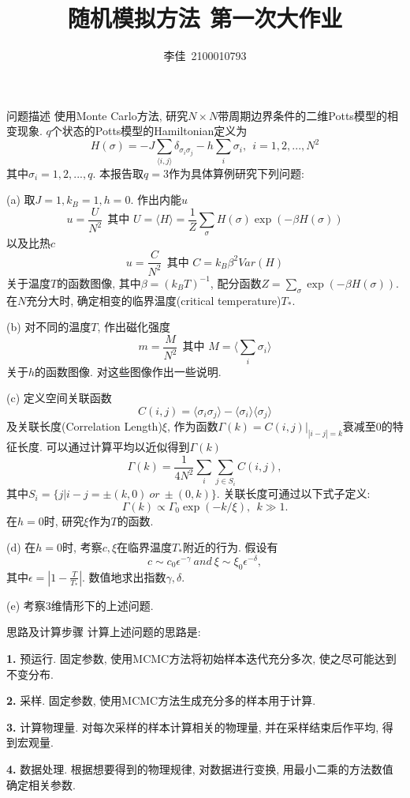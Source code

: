 \documentclass{article}
\title{随机模拟方法$\ \ $第一次大作业}
\author{李佳~2100010793}
\date{}
\begin{document}
\maketitle
\begin{section}{问题描述}
   使用Monte Carlo方法, 研究$N\times N$带周期边界条件的二维Potts模型的相变现象. $q$个状态的Potts模型的Hamiltonian定义为
   $$H(\sigma)=-J\sum_{\langle i,j\rangle}\delta_{\sigma_i\sigma_j}-h\sum_i \sigma_i,\ \ i=1,2,...,N^2$$
   其中$\sigma_i = 1,2,...,q$. 本报告取$q=3$作为具体算例研究下列问题:

   \noindent(a) 取$J=1,k_B=1,h=0$. 作出内能$u$ $$u = \frac{U}{N^2}\ \ \text{其中  } U=\langle H\rangle = \frac{1}{Z}\sum_\sigma H(\sigma)\exp(-\beta H(\sigma))$$
   以及比热$c$ $$u = \frac{C}{N^2}\ \ \text{其中  } C=k_B\beta^2 Var(H)$$
   关于温度$T$的函数图像, 其中$\beta=(k_BT)^{-1}$, 配分函数$Z=\sum_\sigma\exp(-\beta H(\sigma))$. 在$N$充分大时, 确定相变的临界温度(critical temperature)$T_\ast$.

   \noindent(b) 对不同的温度$T$, 作出磁化强度$$m=\frac{M}{N^2}\ \ \text{其中  }M=\langle \sum_i\sigma_i\rangle$$
   关于$h$的函数图像. 对这些图像作出一些说明.

   \noindent(c) 定义空间关联函数$$C(i,j) = \langle\sigma_i\sigma_j\rangle-\langle\sigma_i\rangle\langle\sigma_j\rangle$$
   及关联长度(Correlation Length)$\xi$, 作为函数$\Gamma(k) = C(i,j)\bigg|_{|i-j|=k}$衰减至0的特征长度. 可以通过计算平均以近似得到$\Gamma(k)$
   $$\Gamma(k) = \frac{1}{4N^2}\sum_i\sum_{j\in S_i}C(i,j),$$
   其中$S_i = \{j|i-j=\pm(k,0)\ or\ \pm(0,k)\}$. 关联长度可通过以下式子定义:
   $$\Gamma(k)\propto \Gamma_0\exp(-k/\xi),\ \ k\gg 1.$$
   在$h=0$时, 研究$\xi$作为$T$的函数.

   \noindent(d) 在$h=0$时, 考察$c,\xi$在临界温度$T_\ast$附近的行为. 假设有
   $$c\sim c_0\epsilon^{-\gamma}\ and\ \xi\sim\xi_0\epsilon^{-\delta},$$
   其中$\epsilon=|1-\frac{T}{T_\ast}|$. 数值地求出指数$\gamma,\delta$.

   \noindent(e) 考察3维情形下的上述问题.
\end{section}
\begin{section}{思路及计算步骤}
    计算上述问题的思路是:

    \noindent\textbf{1.} 预运行. 固定参数, 使用MCMC方法将初始样本迭代充分多次, 使之尽可能达到不变分布.
    
    \noindent\textbf{2.} 采样. 固定参数, 使用MCMC方法生成充分多的样本用于计算.
    
    \noindent\textbf{3.} 计算物理量. 对每次采样的样本计算相关的物理量, 并在采样结束后作平均, 得到宏观量.
    
    \noindent\textbf{4.} 数据处理. 根据想要得到的物理规律, 对数据进行变换, 用最小二乘的方法数值确定相关参数.

    \
\end{section}
\end{document}
